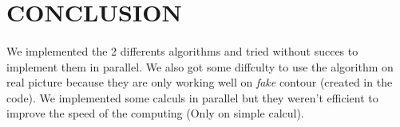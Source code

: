 \section{CONCLUSION}

\paragraph{}
We implemented the 2 differents algorithms and tried without succes to implement them in parallel. We also got some diffculty to use the algorithm on real picture because they are only working well on \textit{fake} contour (created in the code). We implemented some calculs in parallel but they weren't efficient to improve the speed of the computing (Only on simple calcul). 